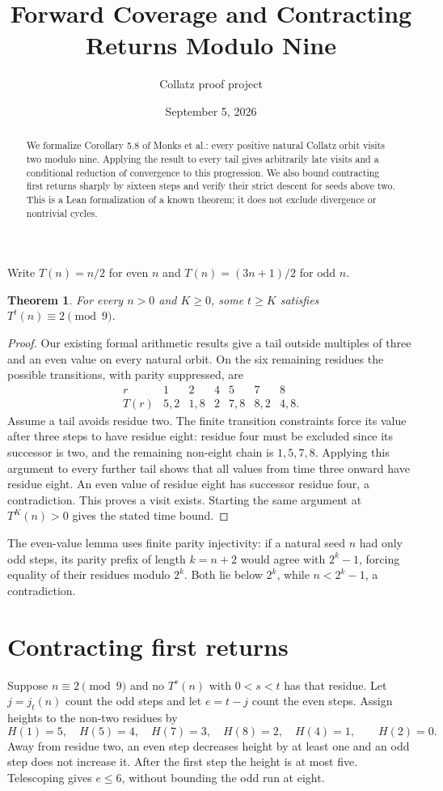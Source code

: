 \documentclass[10pt]{article}
\title{Forward Coverage and Contracting Returns Modulo Nine}
\author{Collatz proof project}
\date{September 5, 2026}
\newtheorem{theorem}{Theorem}
\begin{document}
\raggedright
\maketitle
\begin{abstract}
We formalize Corollary 5.8 of Monks et al.: every positive natural
Collatz orbit visits two modulo nine. Applying the result to every tail
gives arbitrarily late visits and a conditional reduction of convergence
to this progression. We also bound contracting first returns sharply by
sixteen steps and verify their strict descent for seeds above two. This is a Lean formalization of a known theorem;
it does not exclude divergence or nontrivial cycles.
\end{abstract}
Write $T(n)=n/2$ for even $n$ and $T(n)=(3n+1)/2$ for odd $n$.
\begin{theorem}
For every $n>0$ and $K\geq0$, some $t\geq K$ satisfies
$T^t(n)\equiv2\pmod9$.
\end{theorem}
\begin{proof}
Our existing formal arithmetic results give a tail outside multiples of
three and an even value on every natural orbit. On the six remaining
residues the possible transitions, with parity suppressed, are
\[
\begin{array}{c|cccccc}
r&1&2&4&5&7&8\\\hline
T(r)&5,2&1,8&2&7,8&8,2&4,8.
\end{array}
\]
Assume a tail avoids residue two. The finite transition constraints force
its value after three steps to have residue eight: residue four must be excluded since
its successor is two, and the remaining non-eight chain is $1,5,7,8$.
Applying this argument to every further tail shows that all values from
time three onward have residue eight. An even value of residue eight has
successor residue four, a contradiction. This proves a visit exists.
Starting the same argument at $T^K(n)>0$ gives the stated time bound.
\end{proof}
The even-value lemma uses finite parity injectivity: if a natural seed
$n$ had only odd steps, its parity prefix of length $k=n+2$ would agree
with $2^k-1$, forcing equality of their residues modulo $2^k$.
Both lie below $2^k$, while $n<2^k-1$, a contradiction.

\section*{Contracting first returns}
Suppose $n\equiv2\pmod9$ and no $T^s(n)$ with $0<s<t$ has that residue.
Let $j=j_t(n)$ count the odd steps and let $e=t-j$ count the even steps.
Assign heights to the non-two residues by
\[
H(1)=5,\quad H(5)=4,\quad H(7)=3,\quad H(8)=2,\quad H(4)=1,
\qquad H(2)=0.
\]
Away from residue two, an even step decreases height by at least one and
an odd step does not increase it. After the first step the height is at
most five. Telescoping gives $e\leq6$, without bounding the odd run at eight.
\end{document}
